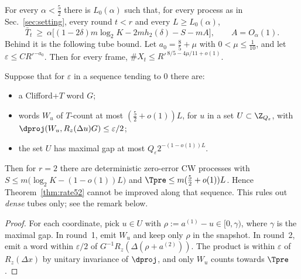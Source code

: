 
\begin{theorem}\label{thm:rate52}
For every $\alpha<\tfrac52$ there is $L_0(\alpha)$ such that, for every process as in
Sec.~\ref{sec:setting}, every round $t<r$ and every $L\ge L_0(\alpha)$,
\[
\bar T_t\ \ge\ \alpha\big[(1-2\delta)m\log_2K-2mh_2(\delta)-S-mA\big],\qquad A=O_\alpha(1).
\]
Behind it is the following tube bound. Let $a_0=\tfrac85+\mu$ with $0<\mu\le\tfrac1{10}$, and let
$\varepsilon\le CR'^{-a_0}$. Then for every frame, $\#X_t\le R'^{\,8/5-4\mu/11+o(1)}$.
\end{theorem}

\begin{proposition}\label{prop:dense}
Suppose that for $\varepsilon$ in a sequence tending to $0$ there are:
\begin{itemize}\setlength\itemsep{0pt}
\item a Clifford+$T$ word $G$;
\item words $W_u$ of $T$-count at most $(\tfrac52+o(1))L$, for $u$ in a set $U\subset\Z_{Q_\varepsilon}$, with
$\dproj(W_u,R_z(\Delta u)G)\le\varepsilon/2$;
\item the set $U$ has maximal gap at most $Q_\varepsilon2^{-(1-o(1))L}$.
\end{itemize}
Then for $r=2$ there are deterministic zero-error CW processes with
$S\le m\big(\log_2K-(1-o(1))L\big)$ and $\Tpre\le m(\tfrac52+o(1))L$. Hence Theorem~\ref{thm:rate52} cannot
be improved along that sequence. This rules out \emph{dense} tubes only; see the remark below.
\end{proposition}
\begin{proof}
For each coordinate, pick $u\in U$ with $\rho:=a^{(1)}-u\in[0,\gamma)$, where $\gamma$ is the maximal gap.
In round~1, emit $W_u$ and keep only $\rho$ in the snapshot. In round~2, emit a word within $\varepsilon/2$ of
$G^{-1}R_z(\Delta(\rho+a^{(2)}))$. The product is within $\varepsilon$ of $R_z(\Delta x)$ by unitary
invariance of $\dproj$, and only $W_u$ counts towards $\Tpre$.
\end{proof}

